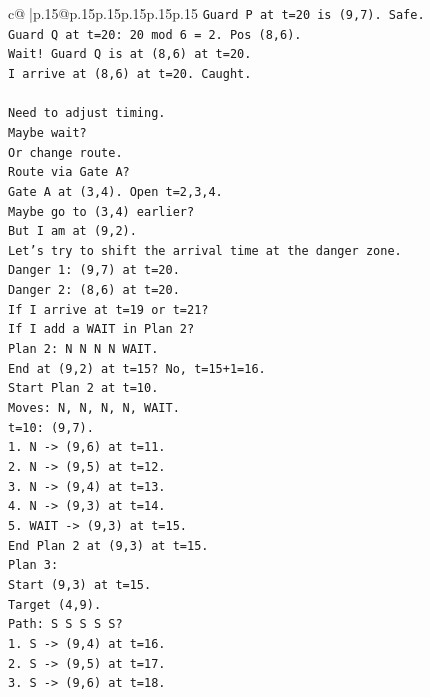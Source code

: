 \documentclass{article}
\begin{document}
{\begin{supertabular}{c@{$\;$}|p{.15\linewidth}@{}p{.15\linewidth}p{.15\linewidth}p{.15\linewidth}p{.15\linewidth}p{.15\linewidth}}
{{{\texttt{Guard P at t=20 is (9,7). Safe.} \\
\texttt{Guard Q at t=20: 20 mod 6 = 2. Pos (8,6).} \\
\texttt{Wait! Guard Q is at (8,6) at t=20.} \\
\texttt{I arrive at (8,6) at t=20. Caught.} \\
\\ 
\texttt{Need to adjust timing.} \\
\texttt{Maybe wait?} \\
\texttt{Or change route.} \\
\texttt{Route via Gate A?} \\
\texttt{Gate A at (3,4). Open t=2,3,4.} \\
\texttt{Maybe go to (3,4) earlier?} \\
\texttt{But I am at (9,2).} \\
\texttt{Let's try to shift the arrival time at the danger zone.} \\
\texttt{Danger 1: (9,7) at t=20.} \\
\texttt{Danger 2: (8,6) at t=20.} \\
\texttt{If I arrive at t=19 or t=21?} \\
\texttt{If I add a WAIT in Plan 2?} \\
\texttt{Plan 2: N N N N WAIT.} \\
\texttt{End at (9,2) at t=15? No, t=15+1=16.} \\
\texttt{Start Plan 2 at t=10.} \\
\texttt{Moves: N, N, N, N, WAIT.} \\
\texttt{t=10: (9,7).} \\
\texttt{1. N {-}> (9,6) at t=11.} \\
\texttt{2. N {-}> (9,5) at t=12.} \\
\texttt{3. N {-}> (9,4) at t=13.} \\
\texttt{4. N {-}> (9,3) at t=14.} \\
\texttt{5. WAIT {-}> (9,3) at t=15.} \\
\texttt{End Plan 2 at (9,3) at t=15.} \\
\texttt{Plan 3:} \\
\texttt{Start (9,3) at t=15.} \\
\texttt{Target (4,9).} \\
\texttt{Path: S S S S S?} \\
\texttt{1. S {-}> (9,4) at t=16.} \\
\texttt{2. S {-}> (9,5) at t=17.} \\
\texttt{3. S {-}> (9,6) at t=18.} \\
}}}
\end{supertabular}}
\end{document}
